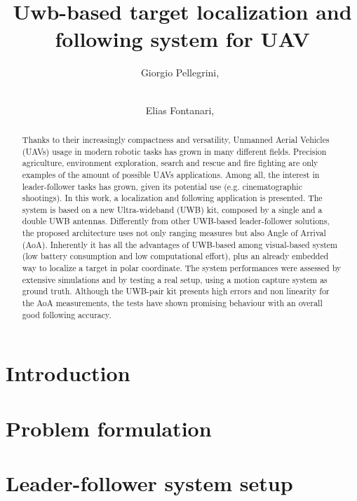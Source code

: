 \documentclass[journal,9pt,a4paper]{IEEEtran}
\begin{document}
\title{Uwb-based target localization and following system for UAV}

\author{Giorgio Pellegrini,~
\and
\\ Elias Fontanari,~
        }
\maketitle
\thispagestyle{plain}
\pagestyle{plain}
\IEEEpeerreviewmaketitle

\begin{abstract}
Thanks to their increasingly compactness and versatility, Unmanned Aerial Vehicles (UAVs) usage in modern robotic tasks has grown in many different fields. Precision agriculture, environment exploration, search and rescue and fire fighting are only examples of the amount of possible UAVs applications. Among all, the interest in leader-follower tasks has grown, given its potential use (e.g. cinematographic shootings). In this work, a localization and following application is presented. The system is based on a new Ultra-wideband (UWB) kit, composed by a single and a double UWB antennas. Differently from other UWB-based leader-follower solutions, the proposed architecture uses not only ranging measures but also Angle of Arrival (AoA). Inherently it has all the advantages of UWB-based among visual-based system (low battery consumption and low computational effort), plus an already embedded way to localize a target in polar coordinate. The system performances were assessed by extensive simulations and by testing a real setup, using a motion capture system as ground truth. Although the UWB-pair kit presents high errors and non linearity for the AoA measurements, the tests have shown promising behaviour with an overall good following accuracy.
\end{abstract}

\section{Introduction}\label{INTRO}


\section{Problem formulation}\label{PRB_FORM}


\section{Leader-follower system setup}\label{ARCHIT}

\end{document}
